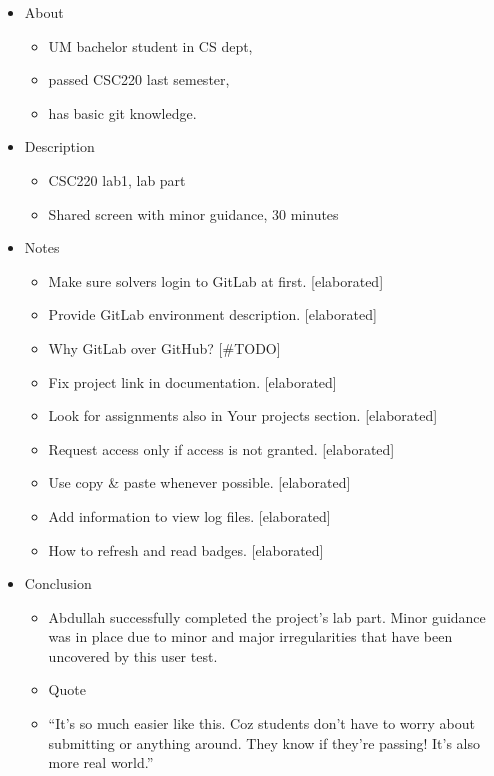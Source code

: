 \begin{itemize}
\item
  {About}
  \begin{itemize}
  \item
    {UM bachelor student in CS dept,}
  \item
    {passed CSC220 last semester,}
  \item
    {has basic git knowledge.}
  \end{itemize}

\item
  {Description}
  \begin{itemize}
  \item
    {CSC220 lab1, lab part}
  \item
    {Shared screen with minor guidance, 30 minutes}
  \end{itemize}

\item
  {Notes}
  \begin{itemize}
  \item
    {Make sure solvers login to GitLab at first. {[}elaborated{]}}
  \item
    {Provide GitLab environment description. {[}elaborated{]}}
  \item
    {Why GitLab over GitHub? {[}\#TODO{]}}
  \item
    {Fix project link in documentation. {[}elaborated{]}}
  \item
    {Look for assignments also in Your projects section. {[}elaborated{]}}
  \item
    {Request access only if access is not granted. {[}elaborated{]}}
  \item
    {Use copy \& paste whenever possible. {[}elaborated{]}}
  \item
    {Add information to view log files. {[}elaborated{]}}
  \item
    {How to refresh and read badges. {[}elaborated{]}}
  \end{itemize}

\item
  {Conclusion}
  \begin{itemize}
  \item
    {Abdullah successfully completed the project's lab part. Minor guidance was in place due to minor and major irregularities that have been uncovered by this user test.}
  \end{itemize}

\begin{itemize}
\item
  {Quote}
\end{itemize}
  \begin{itemize}
  \item
    {``It's so much easier like this. Coz students don't have to worry about submitting or anything around. They know if they're passing! It's also more real world.''}
  \end{itemize}
\end{itemize}

